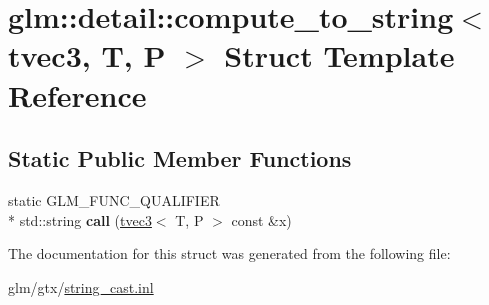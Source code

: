 \hypertarget{structglm_1_1detail_1_1compute__to__string_3_01tvec3_00_01T_00_01P_01_4}{\section{glm\-:\-:detail\-:\-:compute\-\_\-to\-\_\-string$<$ tvec3, T, P $>$ Struct Template Reference}
\label{structglm_1_1detail_1_1compute__to__string_3_01tvec3_00_01T_00_01P_01_4}
}
\subsection*{Static Public Member Functions}
\begin{DoxyCompactItemize}
\item 
\hypertarget{structglm_1_1detail_1_1compute__to__string_3_01tvec3_00_01T_00_01P_01_4_acf3706c18e3084b171b0bcfe4ea64ffa}{static G\-L\-M\-\_\-\-F\-U\-N\-C\-\_\-\-Q\-U\-A\-L\-I\-F\-I\-E\-R \\*
std\-::string {\bfseries call} (\hyperlink{structglm_1_1tvec3}{tvec3}$<$ T, P $>$ const \&x)}\label{structglm_1_1detail_1_1compute__to__string_3_01tvec3_00_01T_00_01P_01_4_acf3706c18e3084b171b0bcfe4ea64ffa}

\end{DoxyCompactItemize}


The documentation for this struct was generated from the following file\-:\begin{DoxyCompactItemize}
\item 
glm/gtx/\hyperlink{string__cast_8inl}{string\-\_\-cast.\-inl}\end{DoxyCompactItemize}
